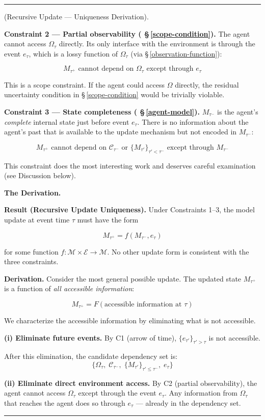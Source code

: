 \documentclass[11pt,oneside]{article}
\newcounter{claim}[section]
\renewcommand{\theclaim}{\thesection.\arabic{claim}}
\newenvironment{segment}[2]{%
  \refstepcounter{claim}%
  \bigskip\noindent\hrule\smallskip
  \noindent{\bfseries #1~\theclaim}\enskip(#2).\par\smallskip
  \noindent\ignorespaces
}{%
  \par\smallskip\noindent\hrule\bigskip
}
\newenvironment{derivation}[1][]{\begin{segment}{Derivation}{#1}}{\end{segment}}
\begin{document}
\begin{derivation}[Recursive Update — Uniqueness Derivation]
\textbf{Constraint 2 — Partial observability ( \S\,\ref{scope-condition}).} The agent cannot access $\Omega_\tau$ directly. Its only interface with the environment is through the event $e_\tau$, which is a lossy function of $\Omega_\tau$ (via \S\,\ref{observation-function}):

$$M_{\tau^+} \text{ cannot depend on } \Omega_\tau \text{ except through } e_\tau$$

This is a scope constraint. If the agent could access $\Omega$ directly, the residual uncertainty condition in \S\,\ref{scope-condition} would be trivially violable.

\textbf{Constraint 3 — State completeness ( \S\,\ref{agent-model}).} $M_{\tau^-}$ is the agent's \textit{complete} internal state just before event $e_\tau$. There is no information about the agent's past that is available to the update mechanism but not encoded in $M_{\tau^-}$:

$$M_{\tau^+} \text{ cannot depend on } \mathcal{C}_{\tau^-} \text{ or } \{M_{\tau'}\}_{\tau' < \tau^-} \text{ except through } M_{\tau^-}$$

This constraint does the most interesting work and deserves careful examination (see Discussion below).


\medskip\noindent\textbf{The Derivation.}


\textbf{Result (Recursive Update Uniqueness).} Under Constraints 1–3, the model update at event time $\tau$ must have the form

$$M_{\tau^+} = f(M_{\tau^-}, e_\tau)$$

for some function $f: \mathcal{M} \times \mathcal{E} \to \mathcal{M}$. No other update form is consistent with the three constraints.

\textbf{Derivation.} Consider the most general possible update. The updated state $M_{\tau^+}$ is a function of \textit{all accessible information}:

$$M_{\tau^+} = F(\text{accessible information at } \tau)$$

We characterize the accessible information by eliminating what is not accessible.

\textbf{(i) Eliminate future events.} By C1 (arrow of time), $\{e_{\tau'}\}_{\tau' > \tau}$ is not accessible.

After this elimination, the candidate dependency set is:
$$\{\Omega_\tau,\; \mathcal{C}_{\tau^-},\; \{M_{\tau'}\}_{\tau' \leq \tau^-},\; e_\tau\}$$

\textbf{(ii) Eliminate direct environment access.} By C2 (partial observability), the agent cannot access $\Omega_\tau$ except through the event $e_\tau$. Any information from $\Omega_\tau$ that reaches the agent does so through $e_\tau$ — already in the dependency set.


\end{derivation}
\end{document}
